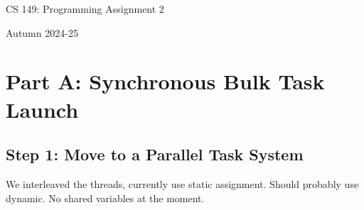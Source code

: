 \documentclass[11pt]{article}
\begin{document}
\fancyhf{}
\setlength{\headheight}{14pt}
\pagestyle{fancy}

\centerline{\Large CS 149: Programming Assignment 2}
\centerline{Autumn 2024-25}

\section*{Part A: Synchronous Bulk Task Launch}

\subsection*{Step 1: Move to a Parallel Task System}

We interleaved the threads, currently use static assignment. Should probably use
dynamic. No shared variables at the moment.
\end{document}
